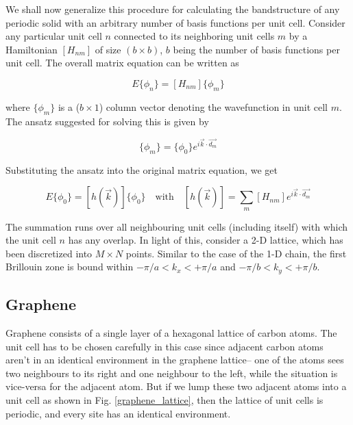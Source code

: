 \documentclass{resonance}
\begin{document}
We shall now generalize this procedure for calculating the bandstructure of any periodic solid with an arbitrary number of basis functions per unit cell. Consider any particular unit cell $n$ connected to its neighboring unit cells $m$ by a Hamiltonian $[H_{nm}]$ of size $(b \times b)$, $b$ being the number of basis functions per unit cell. The overall matrix equation can be written as 

\begin{equation}
     E\{\phi_{n}\} = [H_{nm}]\{\phi_{m}\}
\end{equation} 

where $\{\phi_{m}\}$ is a ($b \times 1$) column vector denoting the wavefunction in unit cell $m$. The ansatz suggested for solving this is given by 

\begin{equation}
    \{\phi_{m}\} = \{\phi_{0}\}e^{i\vec{k}\cdot\vec{d_{m}}}
\end{equation}

Substituting the ansatz into the original matrix equation, we get

\begin{equation}
    E\{\phi_{0}\} = [h(\vec{k})]\{\phi_{0}\} \quad \text{with} \quad [h(\vec{k})] = \sum_{m}[H_{nm}]e^{i\vec{k}\cdot\vec{d_m}}
\end{equation}

The summation runs over all neighbouring unit cells (including itself) with which the unit cell $n$ has any overlap. In light of this, consider a 2-D lattice, which has been discretized into $M \times N$ points. Similar to the case of the 1-D chain, the first Brillouin zone is bound within $-\pi/a < k_x < +\pi/a$ and $-\pi/b < k_y < +\pi/b$.

\subsection{Graphene}

Graphene consists of a single layer of a hexagonal lattice of carbon atoms. The unit cell has to be chosen carefully in this case since adjacent carbon atoms aren't in an identical environment in the graphene lattice-- one of the atoms sees two neighbours to its right and one neighbour to the left, while the situation is vice-versa for the adjacent atom. But if we lump these two adjacent atoms into a unit cell as shown in Fig. \ref{graphene_lattice}, then the lattice of unit cells is periodic, and every site has an identical environment. 
\end{document}
